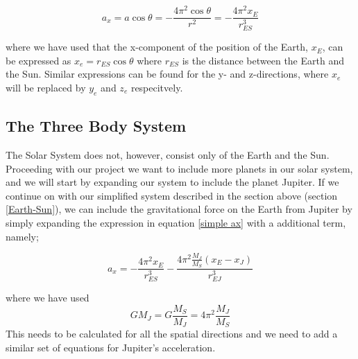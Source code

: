 \documentclass[12pt]{article}
\numberwithin{figure}{section}
\numberwithin{table}{section}
\begin{document}
\begin{equation}
	\label{simple ax}
     a_x=a\cos\theta = - \frac{4\pi^2\cos\theta}{r^2} = - \frac{4 \pi^2 x_E}{r_{ES}^3}
\end{equation}

\noindent where we have used that the x-component of the position of the Earth, $x_E$, can be expressed as $x_e=r_{ES}\cos\theta$ where $r_{ES}$ is the distance between the Earth and the Sun. Similar expressions can be found for the y- and z-directions, where $x_e$ will be replaced by $y_e$ and $z_e$ respecitvely.  \\



\subsection{The Three Body System}
\noindent The Solar System does not, however, consist only of the Earth and the Sun. Proceeding with our project we want to include more planets in our solar system, and we will start by expanding our system to include the planet Jupiter. If we continue on with our simplified system described in the section above (section \ref{Earth-Sun}), we can include the gravitational force on the Earth from Jupiter by simply expanding the expression in equation \eqref{simple ax} with a additional term, namely;

\begin{equation}
		\label{three ax}
		a_x = - \frac{4 \pi^2 x_E}{r_{ES}^3} - \frac{4 \pi^2 \frac{M_J}{M_S} (x_E-x_J)}{r_{EJ}^3}
\end{equation}

\noindent  where we have used $$GM_J=G\frac{M_S}{M_J}=4\pi^2\frac{M_J}{M_S}$$This needs to be calculated for all the spatial directions and we need to add a similar set of equations for Jupiter's acceleration. \\ 


\end{document}
